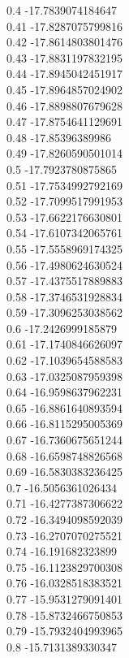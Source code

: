 {0.4	-17.7839074184647\\
0.41	-17.8287075799816\\
0.42	-17.8614803801476\\
0.43	-17.8831197832195\\
0.44	-17.8945042451917\\
0.45	-17.8964857024902\\
0.46	-17.8898807679628\\
0.47	-17.8754641129691\\
0.48	-17.85396389986\\
0.49	-17.8260590501014\\
0.5	-17.7923780875865\\
0.51	-17.7534992792169\\
0.52	-17.7099517991953\\
0.53	-17.6622176630801\\
0.54	-17.6107342065761\\
0.55	-17.5558969174325\\
0.56	-17.4980624630524\\
0.57	-17.4375517889883\\
0.58	-17.3746531928834\\
0.59	-17.3096253038562\\
0.6	-17.2426999185879\\
0.61	-17.1740846626097\\
0.62	-17.1039654588583\\
0.63	-17.0325087959398\\
0.64	-16.9598637962231\\
0.65	-16.8861640893594\\
0.66	-16.8115295005369\\
0.67	-16.7360675651244\\
0.68	-16.6598748826568\\
0.69	-16.5830383236425\\
0.7	-16.5056361026434\\
0.71	-16.4277387306622\\
0.72	-16.3494098592039\\
0.73	-16.2707070275521\\
0.74	-16.191682323899\\
0.75	-16.1123829700308\\
0.76	-16.0328518383521\\
0.77	-15.9531279091401\\
0.78	-15.8732466750853\\
0.79	-15.7932404993965\\
0.8	-15.7131389330347\\
}
